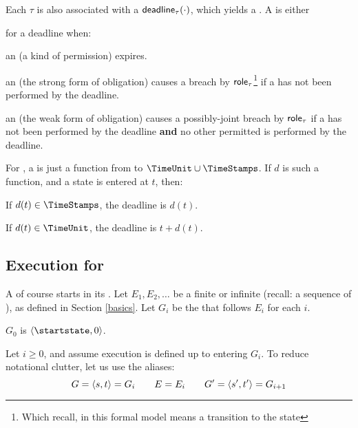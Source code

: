 \documentclass[12pt]{article}
\begin{document}
Each \transition $\tau$ is also associated with a  $\textsf{deadline}_{\tau}(\cdot)$, which yields a . A \Deadline is either 


\TimeStamp for a deadline when: 
	\begin{LPPI}
	\item an \enabled \mayntran (a kind of permission) expires.
	\item an \enabled \mustntran (the strong form of obligation) causes a breach by $\textsf{role}_{\tau}$\footnote{Which recall, in this formal model means a transition to the state \breached{\{\role{\tau}\}}} if a \compatible \Event has not been performed by the deadline. 
	\item an \enabled \rmustntran (the weak form of obligation) causes a possibly-joint breach by $\textsf{role}_{\tau}$ if a \compatible \Event has not been performed by the deadline {\bf and} no other permitted \Event is performed by the deadline. 
	\end{LPPI}
For \FSContracts, a \DeadlineFn is just a function from \TimeStamps to $\TimeUnit \cup \TimeStamps$. If $d$ is such a function, and a state is entered at \TimeStamp $t$, then:
\begin{LPPI}
\item If $d(t) \in \TimeStamps$, the deadline is $d(t)$.
	\item If $d(t) \in \TimeUnit$, the deadline is $t + d(t)$.
\end{LPPI}


%


\subsection{Execution for \FSContracts}
A \FSContract of course starts in its \startstate. Let $E_1, E_2, \dots$ be a finite or infinite \trace (recall: a sequence of \Events), as defined in Section \ref{basics}. Let $G_i$ be the \GlobalState that follows $E_i$ for each $i$.

$G_0$ is $\tup{\startstate, 0}$.  

Let $i \geq 0$, and assume execution is defined up to entering $G_i$. To reduce notational clutter, let us use the aliases:
\[ G = \langle s,t\rangle = G_i  \qquad E = E_i \qquad  G' = \langle s',t'\rangle = G_{i+1} \]
\end{document}
